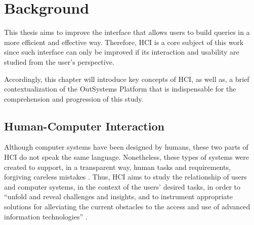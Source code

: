 \chapter{Background}
\label{cha:background}
This thesis aims to improve the interface that allows users to build queries in a more efficient and effective way. Therefore, \gls{HCI} is a core subject of this work since such interface can only be improved if its interaction and usability are studied from the user's perspective.

Accordingly, this chapter will introduce key concepts of \gls{HCI}, as well as, a brief contextualization of the OutSystems Platform that is indispensable for the comprehension and progression of this study.

\section{Human-Computer Interaction}
\label{sec:human_computer_interaction}
Although computer systems have been designed by humans, these two parts of \gls{HCI} do not speak the same language. Nonetheless, these types of systems were created to support, in a transparent way, human tasks and requirements, forgiving careless mistakes \cite{humanComputerInteraction}. Thus, \gls{HCI} aims to study the relationship of users and computer systems, in the context of the users’ desired tasks, in order to “unfold and reveal challenges and insights, and to instrument appropriate solutions for alleviating the current obstacles to the access and use of advanced information technologies” \cite{userInterfacesForAll_newPerspectivesIntoHumanComputerInteraction}. 





